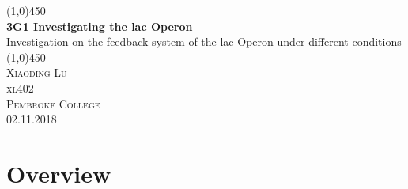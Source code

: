 \documentclass{article}
\begin{document}
\begin{titlepage}
	\begin{center}
	\line(1,0){450}\\
	[0.25in]
	\huge{\bfseries 3G1 Investigating the lac Operon} \\
	[0.25in]
     \large Investigation on the feedback system of the lac Operon under different conditions\\
     \line(1,0){450} \\
	[12cm]
	\textsc{\Large Xiaoding Lu \\[1cm] xl402 \\ Pembroke College \\[1.2cm] 02.11.2018}\\
	\end{center}
	\begin{flushright}

	\begin{figure}[htp]
	\begin{flushright}
	\end{flushright}
	\end{figure}
	\end{flushright}

	\vspace{2cm}

\end{titlepage}

\cleardoublepage
{}
\cleardoublepage
{}
\section{Overview}
\end{document}
